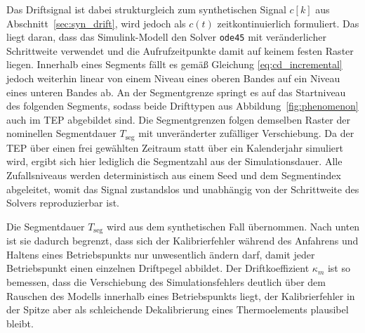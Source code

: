 Das Driftsignal ist dabei strukturgleich zum synthetischen Signal $c[k]$ aus Abschnitt~\ref{sec:syn_drift}, wird jedoch als $c(t)$ zeitkontinuierlich formuliert. Das liegt daran, dass das Simulink-Modell den Solver \texttt{ode45} mit veränderlicher Schrittweite verwendet und die Aufrufzeitpunkte damit auf keinem festen Raster liegen.
Innerhalb eines Segments fällt es gemäß Gleichung \eqref{eq:cd_incremental} jedoch weiterhin linear von einem Niveau eines oberen Bandes auf ein Niveau eines unteren Bandes ab. An der Segmentgrenze springt es auf das Startniveau des folgenden Segments, sodass beide Drifttypen aus Abbildung~\ref{fig:phenomenon} auch im \ac{TEP} abgebildet sind.
Die Segmentgrenzen folgen demselben Raster der nominellen Segmentdauer $T_{\mathrm{seg}}$ mit unveränderter zufälliger Verschiebung. Da der \ac{TEP} über einen frei gewählten Zeitraum statt über ein Kalenderjahr simuliert wird, ergibt sich hier lediglich die Segmentzahl aus der Simulationsdauer. Alle Zufallsniveaus werden deterministisch aus einem Seed und dem Segmentindex abgeleitet, womit das Signal zustandslos und unabhängig von der Schrittweite des Solvers reproduzierbar ist. \par
%
Die Segmentdauer $T_{\mathrm{seg}}$ wird aus dem synthetischen Fall übernommen. Nach unten ist sie dadurch begrenzt, dass sich der Kalibrierfehler während des Anfahrens und Haltens eines Betriebspunkts nur unwesentlich ändern darf, damit jeder Betriebspunkt einen einzelnen Driftpegel abbildet. Der Driftkoeffizient $\kappa_m$ ist so bemessen, dass die Verschiebung des Simulationsfehlers deutlich über dem Rauschen des Modells innerhalb eines Betriebspunkts liegt, der Kalibrierfehler in der Spitze aber als schleichende Dekalibrierung eines Thermoelements plausibel bleibt. \par
%
